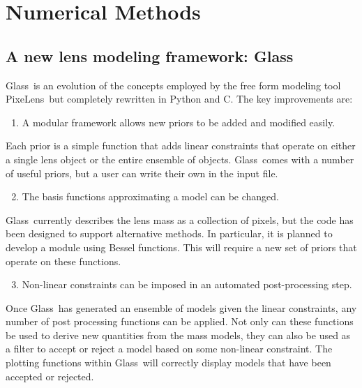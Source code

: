 \documentclass[onecolumn,galley]{mn2e}
\newcommand{\Glass}{{\sc Glass}}
\newcommand{\PixeLens}{{\sc PixeLens}}
\begin{document}
\section{Numerical Methods} 

\subsection{A new lens modeling framework: \Glass}

\Glass\ is an evolution of the concepts employed by the free form modeling tool
\PixeLens\ but completely rewritten in Python and C. The key improvements are:
%
\begin{enumerate}
  \setcounter{enumi}{0}
  \item A modular framework allows new priors to be added and modified easily.
\end{enumerate}
%
Each prior is a simple function that adds linear constraints that operate on either
a single lens object or the entire ensemble of objects. \Glass\ comes with a number
of useful priors, but a user can write their own in the input file.
%
\begin{enumerate}
  \setcounter{enumi}{1}
  \item The basis functions approximating a model can be changed. 
\end{enumerate}
%
\Glass\ currently describes the lens mass as a collection of pixels, but the code
has been designed to support alternative methods. In particular, it is planned
to develop a module using Bessel functions. This will require a new set of 
priors that operate on these functions.
%
\begin{enumerate}
  \setcounter{enumi}{2}
  \item Non-linear constraints can be imposed in an automated post-processing step. 
\end{enumerate}
%
Once \Glass\ has generated an ensemble of models given the linear constraints, any number
of post processing functions can be applied. Not only can these functions be used to
derive new quantities from the mass models, they can also be used as a filter to 
accept or reject a model based on some non-linear constraint. The plotting functions
within \Glass\ will correctly display models that have been accepted or rejected.
\end{document}

